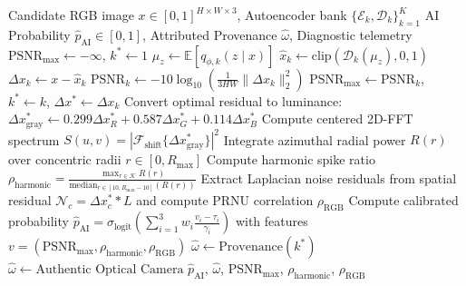 \documentclass{article}
\theoremstyle{definition}
\begin{document}
\begin{algorithm}[t]
\caption{Latent Resonance Zero-Shot Forensic Evaluation Pipeline}
\label{alg:latent_resonance}
\begin{algorithmic}[1]
\REQUIRE Candidate RGB image $x \in [0, 1]^{H \times W \times 3}$, Autoencoder bank $\{\mathcal{E}_k, \mathcal{D}_k\}_{k=1}^K$
\ENSURE AI Probability $\hat{p}_{\text{AI}} \in [0, 1]$, Attributed Provenance $\hat{\omega}$, Diagnostic telemetry
\STATE $\text{PSNR}_{\max} \leftarrow -\infty$, $k^* \leftarrow 1$
    \STATE $\mu_z \leftarrow \mathbb{E}[q_{\phi, k}(z \mid x)]$ 
    \STATE $\hat{x}_k \leftarrow \text{clip}(\mathcal{D}_k(\mu_z), 0, 1)$ 
    \STATE $\Delta x_k \leftarrow x - \hat{x}_k$
    \STATE $\text{PSNR}_k \leftarrow -10 \log_{10}(\frac{1}{3HW}\|\Delta x_k\|_2^2)$
        \STATE $\text{PSNR}_{\max} \leftarrow \text{PSNR}_k$, $k^* \leftarrow k$, $\Delta x^* \leftarrow \Delta x_k$
    \ENDIF
\ENDFOR
\STATE Convert optimal residual to luminance: $\Delta x^*_{\text{gray}} \leftarrow 0.299 \Delta x^*_R + 0.587 \Delta x^*_G + 0.114 \Delta x^*_B$
\STATE Compute centered 2D-FFT spectrum $S(u, v) = |\mathcal{F}_{\text{shift}}\{\Delta x^*_{\text{gray}}\}|^2$
\STATE Integrate azimuthal radial power $R(r)$ over concentric radii $r \in [0, R_{\max}]$
\STATE Compute harmonic spike ratio $\rho_{\text{harmonic}} = \frac{\max_{r \in \mathcal{K}} R(r)}{\text{median}_{r \in [10, R_{\max}-10]}(R(r))}$
\STATE Extract Laplacian noise residuals from spatial residual $\mathcal{N}_c = \Delta x^*_c * L$ and compute PRNU correlation $\rho_{\text{RGB}}$
\STATE Compute calibrated probability $\hat{p}_{\text{AI}} = \sigma_{\text{logit}}\left( \sum_{i=1}^3 w_i \frac{v_i - \tau_i}{\gamma_i} \right)$ with features $v = (\text{PSNR}_{\max}, \rho_{\text{harmonic}}, \rho_{\text{RGB}})$
    \STATE $\hat{\omega} \leftarrow \text{Provenance}(k^*)$ 
\ELSE
    \STATE $\hat{\omega} \leftarrow \text{Authentic Optical Camera}$
\ENDIF
\RETURN $\hat{p}_{\text{AI}}$, $\hat{\omega}$, $\text{PSNR}_{\max}$, $\rho_{\text{harmonic}}$, $\rho_{\text{RGB}}$
\end{algorithmic}
\end{algorithm}
\end{document}
